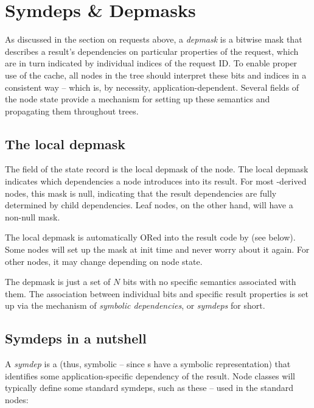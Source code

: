 \chapter{Symdeps \& Depmasks}

  As discussed in the section on requests above, a {\em depmask} is a bitwise
  mask that describes a result's dependencies on particular properties of the
  request, which are in turn indicated by individual indices of the request ID.
  To enable proper use of the cache, all nodes in the tree should interpret
  these bits and indices in a consistent way -- which is, by necessity,
  application-dependent. Several fields of the node state provide a mechanism
  for setting up these semantics and propagating them throughout trees. 

\section{The local depmask}
  
  The  field of the state record is the local depmask of the
  node. The local depmask indicates which dependencies a node introduces into
  its result. For most -derived nodes, this mask is null,
  indicating that the result dependencies are fully determined by child
  dependencies. Leaf nodes, on the other hand, will have a non-null mask.

  The local depmask is automatically ORed into the result code by
   (see below). Some nodes will set up the mask at init
  time and never worry about it again. For other nodes, it may change depending
  on node state.

  The depmask is just a set of $N$ bits with no specific semantics associated
  with them. The association between individual bits and specific result
  properties is set up via the mechanism of {\em symbolic dependencies}, or
  {\em symdeps} for short.
  
\section{Symdeps in a nutshell}
  
  A {\em symdep} is a  (thus, symbolic -- since s have a
  symbolic representation) that identifies some application-specific dependency
  of the result. Node classes will typically define some standard symdeps, such
  as these -- used in the standard nodes:

